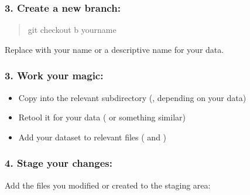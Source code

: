 \documentclass[letterpaper,10pt,english]{sphinxhowto}
\begin{document}
\begin{description}
\subsubsection{3. Create a new branch:}
\label{\detokenize{get-started:create-a-new-branch}}\begin{quote}

\sphinxAtStartPar
git checkout \sphinxhyphen{}b your\sphinxhyphen{}name
\end{quote}

\sphinxAtStartPar
Replace  with your name or a  descriptive name for your data.


\subsubsection{3. Work your magic:}
\label{\detokenize{get-started:work-your-magic}}\begin{itemize}
\item {} 
\sphinxAtStartPar
Copy  into the relevant sub\sphinxhyphen{}directory (,  depending on your data)

\item {} 
\sphinxAtStartPar
Re\sphinxhyphen{}tool it for your data ( or something similar)

\item {} 
\sphinxAtStartPar
Add your dataset to relevant  files ( and )

\end{itemize}


\subsubsection{4. Stage your changes:}
\label{\detokenize{get-started:stage-your-changes}}
\sphinxAtStartPar
Add the files you modified or created to the staging area:

\begin{sphinxVerbatim}[commandchars=\\\{\}]
  
\end{sphinxVerbatim}



\end{description}
\end{document}
